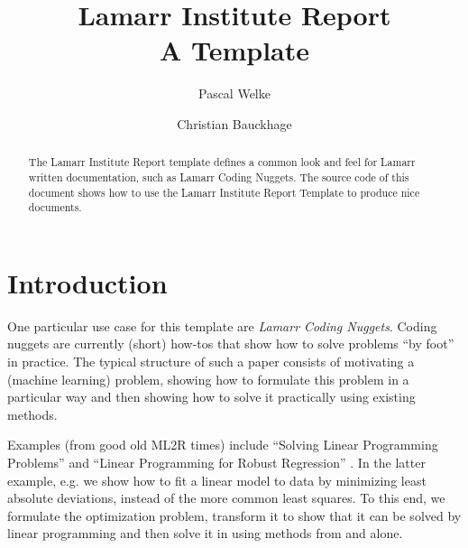 \documentclass[fleqn,svgnames]{lamarrreport}
\begin{document}


\title[Lamarr Institute Report]{Lamarr Institute Report \\ A Template}


\author[P. Welke]{Pascal Welke}

\author[C. Bauckhage]{Christian Bauckhage}

\begin{abstract}
The Lamarr Institute Report template defines a common look and feel for Lamarr written documentation, such as Lamarr Coding Nuggets. 
The source code of this document shows how to use the Lamarr Institute Report Template to produce nice documents.
\end{abstract}

\maketitle



\section{Introduction}

One particular use case for this template are \emph{Lamarr Coding Nuggets}.
Coding nuggets are currently (short) how-tos that show how to solve problems ``by foot'' in practice.
The typical structure of such a paper consists of motivating a (machine learning) problem, showing how to formulate this problem in a particular way and then showing how to solve it practically using existing methods. 

Examples (from good old ML2R times) include ``Solving Linear Programming Problems'' \cite{Welke2020-SLP} and ``Linear Programming for Robust Regression'' \cite{Welke2020-SLP2}.
In the latter example, e.g. we show how to fit a linear model to data by minimizing least absolute deviations, instead of the more common least squares. 
To this end, we formulate the optimization problem, transform it to show that it can be solved by linear programming and then solve it in  using methods from  and  alone.  
\end{document}
